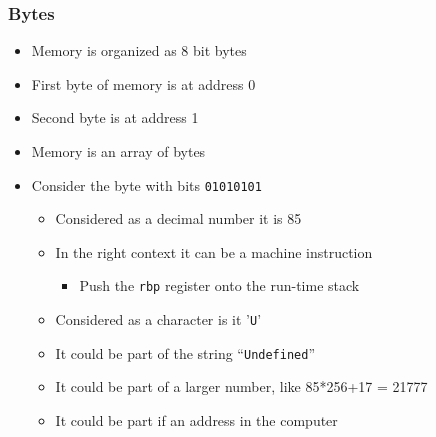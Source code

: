 \documentclass{beamer}
\begin{document}
\begin{frame}
    \frametitle{Bytes}
    \begin{itemize}
        \item Memory is organized as 8 bit bytes
        \item First byte of memory is at address 0
        \item Second byte is at address 1
        \item Memory is an array of bytes
        \item Consider the byte with bits {\tt 01010101}
        \begin{itemize}
            \item Considered as a decimal number it is 85
            \item In the right context it can be a machine instruction
            \begin{itemize}
                \item Push the {\tt rbp} register onto the run-time stack
            \end{itemize}
            \item Considered as a character is it '{\tt U}'
            \item It could be part of the string ``{\tt Undefined}''
            \item It could be part of a larger number, like 85*256+17 = 21777
            \item It could be part if an address in the computer
        \end{itemize}
    \end{itemize}
\end{frame}
\end{document}
